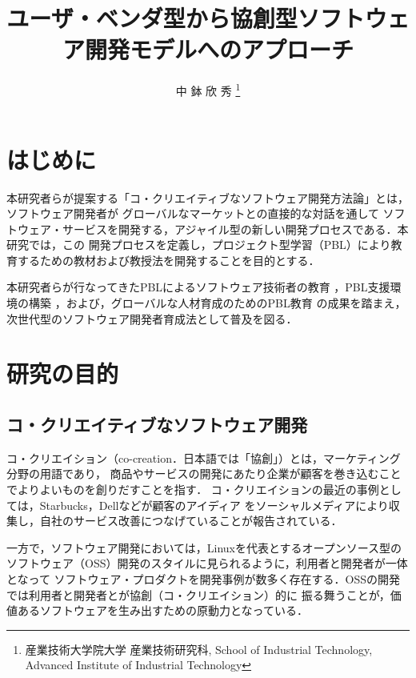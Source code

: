 \documentclass[a4j,9pt,twoside,twocolumn]{jsarticle}
\title{ユーザ・ベンダ型から協創型ソフトウェア開発モデルへのアプローチ}
\author{
中 鉢 欣 秀
\thanks{産業技術大学院大学 産業技術研究科, School of Industrial Technology, Advanced Institute of Industrial Technology}
}
\begin{document}
\pagestyle{empty}
\maketitle\thispagestyle{empty} %
\makereceivedon %

\section{はじめに}

	本研究者らが提案する「コ・クリエイティブなソフトウェア開発方法論」とは，ソフトウェア開発者が
	グローバルなマーケットとの直接的な対話を通して
	ソフトウェア・サービスを開発する，アジャイル型の新しい開発プロセスである．本研究では，この
	開発プロセスを定義し，プロジェクト型学習（PBL）により教育するための教材および教授法を開発することを目的とする．
	
	本研究者らが行なってきたPBLによるソフトウェア技術者の教育
	\cite{pub:tozawa-pbl-2009}
	\cite{pub:matsuzawa-2008}
	，PBL支援環境の構築
	\cite{pub:chubachi-ipbl-2012}
	\cite{pub:chubachi-ipbl-2011}
	\cite{pub:chubachi-ipbl-2009b}
	\cite{pub:chubachi-ipbl-2009a}
	，および，グローバルな人材育成のためのPBL教育
	\cite{pub:chubachi-global-2010}
	\cite{pub:nishino-2010}
	の成果を踏まえ，
	次世代型のソフトウェア開発者育成法として普及を図る．
	
\section{研究の目的}
\subsection{コ・クリエイティブなソフトウェア開発}

    コ・クリエイション（co-creation．日本語では「協創」）とは，マーケティング分野の用語であり，
    商品やサービスの開発にあたり企業が顧客を巻き込むことでよりよいものを創りだすことを指す．
    コ・クリエイションの最近の事例としては，Starbucks，Dellなどが顧客のアイディア
    をソーシャルメディアにより収集し，自社のサービス改善につなげていることが報告されている\cite{wired}．

    一方で，ソフトウェア開発においては，Linuxを代表とするオープンソース型の
    ソフトウェア（OSS）開発のスタイルに見られるように，利用者と開発者が一体となって
    ソフトウェア・プロダクトを開発事例が数多く存在する．OSSの開発では利用者と開発者とが協創（コ・クリエイション）的に
    振る舞うことが，価値あるソフトウェアを生み出すための原動力となっている\cite{oss}．
    
\end{document}
